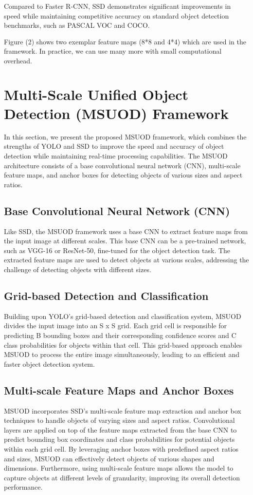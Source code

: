 \documentclass[conference]{IEEEtran}
\begin{document}
\begin{itemize}
Compared to Faster R-CNN, SSD demonstrates significant improvements in speed while maintaining competitive accuracy on standard object detection benchmarks, such as PASCAL VOC and COCO.

Figure (2) shows two exemplar feature maps (8*8 and 4*4) which are used in the framework. In practice, we can use many more with small computational overhead.

\section{Multi-Scale Unified Object Detection (MSUOD) Framework}

In this section, we present the proposed MSUOD framework, which combines the strengths of YOLO and SSD to improve the speed and accuracy of object detection while maintaining real-time processing capabilities. The MSUOD architecture consists of a base convolutional neural network (CNN), multi-scale feature maps, and anchor boxes for detecting objects of various sizes and aspect ratios.

\subsection{Base Convolutional Neural Network (CNN)}\label{AA}
Like SSD, the MSUOD framework uses a base CNN to extract feature maps from the input image at different scales. This base CNN can be a pre-trained network, such as VGG-16 or ResNet-50, fine-tuned for the object detection task. The extracted feature maps are used to detect objects at various scales, addressing the challenge of detecting objects with different sizes.

\subsection{Grid-based Detection and Classification}\label{AA}
Building upon YOLO's grid-based detection and classification system, MSUOD divides the input image into an S x S grid. Each grid cell is responsible for predicting B bounding boxes and their corresponding confidence scores and C class probabilities for objects within that cell. This grid-based approach enables MSUOD to process the entire image simultaneously, leading to an efficient and faster object detection system.

\subsection{Multi-scale Feature Maps and Anchor Boxes}
MSUOD incorporates SSD's multi-scale feature map extraction and anchor box techniques to handle objects of varying sizes and aspect ratios. Convolutional layers are applied on top of the feature maps extracted from the base CNN to predict bounding box coordinates and class probabilities for potential objects within each grid cell.
By leveraging anchor boxes with predefined aspect ratios and sizes, MSUOD can effectively detect objects of various shapes and dimensions. Furthermore, using multi-scale feature maps allows the model to capture objects at different levels of granularity, improving its overall detection performance.


\end{itemize}
\end{document}
